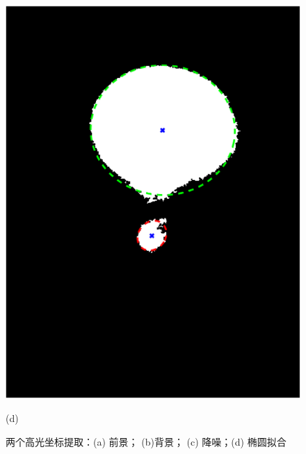 \begin{figure}[!htbp]
\begin{minipage}{0.3\linewidth}
                \centerline{\includegraphics[width=\textwidth]{FIG/fig9d.pdf}}
                \centerline{(d)}
              \end{minipage}
              \vfill
              \caption{两个高光坐标提取：(a) 前景； (b)背景； (c) 降噪；(d) 椭圆拟合}
              \label{fig:image processing}
  \end{figure}

